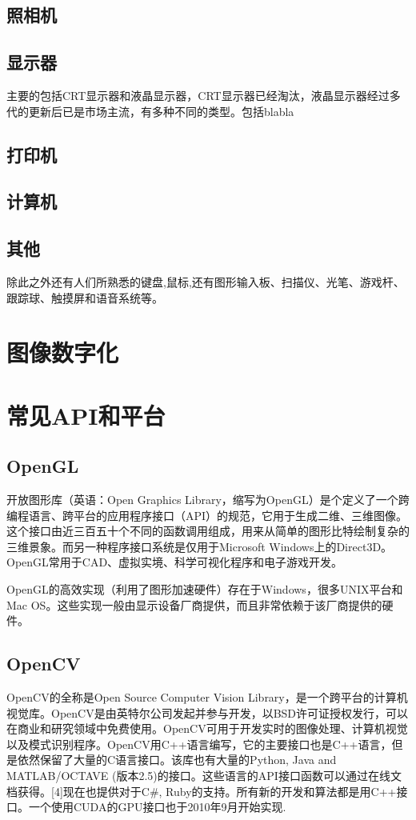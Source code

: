 \documentclass[UTF8]{article}
\begin{document}
\subsection{照相机}

\subsection{显示器}
主要的包括CRT显示器和液晶显示器，CRT显示器已经淘汰，液晶显示器经过多代的更新后已是市场主流，有多种不同的类型。包括blabla
\subsection{打印机}

\subsection{计算机}
\subsection{其他}
除此之外还有人们所熟悉的键盘,鼠标,还有图形输入板、扫描仪、光笔、游戏杆、跟踪球、触摸屏和语音系统等。

\section{图像数字化}




\section{常见API和平台}
\subsection{OpenGL}
开放图形库（英语：Open Graphics Library，缩写为OpenGL）是个定义了一个跨编程语言、跨平台的应用程序接口（API）的规范，它用于生成二维、三维图像。这个接口由近三百五十个不同的函数调用组成，用来从简单的图形比特绘制复杂的三维景象。而另一种程序接口系统是仅用于Microsoft Windows上的Direct3D。OpenGL常用于CAD、虚拟实境、科学可视化程序和电子游戏开发。

OpenGL的高效实现（利用了图形加速硬件）存在于Windows，很多UNIX平台和Mac OS。这些实现一般由显示设备厂商提供，而且非常依赖于该厂商提供的硬件。
\subsection{OpenCV}
OpenCV的全称是Open Source Computer Vision Library，是一个跨平台的计算机视觉库。OpenCV是由英特尔公司发起并参与开发，以BSD许可证授权发行，可以在商业和研究领域中免费使用。OpenCV可用于开发实时的图像处理、计算机视觉以及模式识别程序。OpenCV用C++语言编写，它的主要接口也是C++语言，但是依然保留了大量的C语言接口。该库也有大量的Python, Java and MATLAB/OCTAVE (版本2.5)的接口。这些语言的API接口函数可以通过在线文档获得。[4]现在也提供对于C\#, Ruby的支持。所有新的开发和算法都是用C++接口。一个使用CUDA的GPU接口也于2010年9月开始实现.
\end{document}
